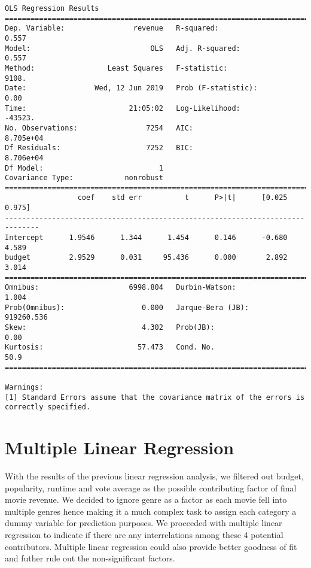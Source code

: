 \documentclass[11pt]{article}
\begin{document}
    \begin{Verbatim}[commandchars=\\\{\}]
                            OLS Regression Results                            
==============================================================================
Dep. Variable:                revenue   R-squared:                       0.557
Model:                            OLS   Adj. R-squared:                  0.557
Method:                 Least Squares   F-statistic:                     9108.
Date:                Wed, 12 Jun 2019   Prob (F-statistic):               0.00
Time:                        21:05:02   Log-Likelihood:                -43523.
No. Observations:                7254   AIC:                         8.705e+04
Df Residuals:                    7252   BIC:                         8.706e+04
Df Model:                           1                                         
Covariance Type:            nonrobust                                         
==============================================================================
                 coef    std err          t      P>|t|      [0.025      0.975]
------------------------------------------------------------------------------
Intercept      1.9546      1.344      1.454      0.146      -0.680       4.589
budget         2.9529      0.031     95.436      0.000       2.892       3.014
==============================================================================
Omnibus:                     6998.804   Durbin-Watson:                   1.004
Prob(Omnibus):                  0.000   Jarque-Bera (JB):           919260.536
Skew:                           4.302   Prob(JB):                         0.00
Kurtosis:                      57.473   Cond. No.                         50.9
==============================================================================

Warnings:
[1] Standard Errors assume that the covariance matrix of the errors is correctly specified.

    \end{Verbatim}

    \section{Multiple Linear Regression}\label{multiple-linear-regression}

With the results of the previous linear regression analysis, we filtered
out budget, popularity, runtime and vote average as the possible
contributing factor of final movie revenue. We decided to ignore genre
as a factor as each movie fell into multiple genres hence making it a
much complex task to assign each category a dummy variable for
prediction purposes. We proceeded with multiple linear regression to
indicate if there are any interrelations among these 4 potential
contributors. Multiple linear regression could also provide better
goodness of fit and futher rule out the non-significant factors.
\end{document}
